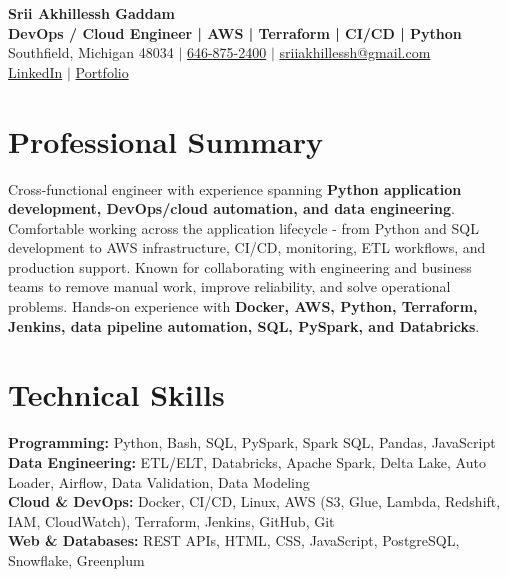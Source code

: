 \documentclass[letterpaper,10pt]{article}
\begin{document}
\fontsize{9.35pt}{10.45pt}\selectfont

\begin{center}
    {\LARGE \textbf{Srii Akhillessh Gaddam}} \\[-1pt]
    \textbf{DevOps / Cloud Engineer | AWS | Terraform | CI/CD | Python} \\[2pt]
    Southfield, Michigan 48034 $|$
    \href{tel:6468752400}{646-875-2400} $|$
    \href{mailto:sriiakhillessh@gmail.com}{sriiakhillessh@gmail.com} \\[1pt]
    \href{https://www.linkedin.com/in/srii-akhiilessh-gaddam-b48668191/}{LinkedIn} $|$
    \href{https://sriiakhillesshg.github.io/portfolio/}{Portfolio}
\end{center}
\vspace{-8pt}

\section{Professional Summary}
\small{Cross-functional engineer with experience spanning \textbf{Python application development, DevOps/cloud automation, and data engineering}. Comfortable working across the application lifecycle - from Python and SQL development to AWS infrastructure, CI/CD, monitoring, ETL workflows, and production support. Known for collaborating with engineering and business teams to remove manual work, improve reliability, and solve operational problems. Hands-on experience with \textbf{Docker, AWS, Python, Terraform, Jenkins, data pipeline automation, SQL, PySpark, and Databricks}.}

\section{Technical Skills}
\small{
\textbf{Programming:} Python, Bash, SQL, PySpark, Spark SQL, Pandas, JavaScript \\
\textbf{Data Engineering:} ETL/ELT, Databricks, Apache Spark, Delta Lake, Auto Loader, Airflow, Data Validation, Data Modeling \\
\textbf{Cloud \& DevOps:} Docker, CI/CD, Linux, AWS (S3, Glue, Lambda, Redshift, IAM, CloudWatch), Terraform, Jenkins, GitHub, Git \\
\textbf{Web \& Databases:} REST APIs, HTML, CSS, JavaScript, PostgreSQL, Snowflake, Greenplum
}
\end{document}
